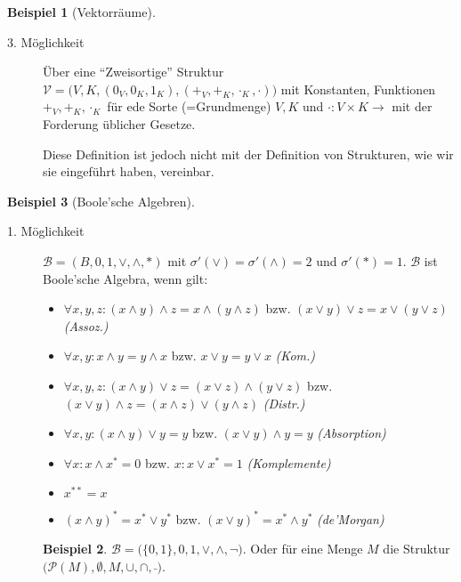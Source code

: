 \documentclass{article}
\theoremstyle{definition}
\newtheorem*{bsp}{Beispiel}
\theoremstyle{plain}
\newcommand{\m}[1]{\mathcal{#1}}
\begin{document}
\begin{bsp}[Vektorräume]
\begin{description}
            \item[3. Möglichkeit]
            Über eine ``Zweisortige'' Struktur $ \m{V} = \big(V, K, (0_V, 0_K, 1_K), (+_V, +_K, \cdot_K, \cdot)\big) $ mit Konstanten, Funktionen $ +_V, +_K, \cdot_K $ für ede Sorte (=Grundmenge) $ V, K $ und $ \cdot : V \times K \rightarrow $ mit der Forderung üblicher Gesetze.

            Diese Definition ist jedoch nicht mit der Definition von Strukturen, wie wir sie eingeführt haben, vereinbar.
        \end{description}
    \end{bsp}

    \begin{bsp}[Boole'sche Algebren]
        ~\par
        \begin{description}
            \item[1. Möglichkeit]
            \label{itm:boolesche-algebra-struktur}
            $ \m{B}= (B, 0, 1, \lor, \land, *) $ mit $ \sigma'(\lor) = \sigma'(\land) = 2 $ und $ \sigma'(*) = 1 $.
            $ \m{B} $ ist Boole'sche Algebra, wenn gilt:
            \begin{itemize}
                \item $ \forall x, y, z: (x \land y) \land z = x \land (y \land z) $ bzw. $ (x \lor y) \lor z = x \lor (y \lor z) $ \hfill \textit{(Assoz.)}
                \item $ \forall x, y: x \land y = y \land x $ bzw. $ x \lor y = y \lor x $ \hfill \textit{(Kom.)}
                \item $ \forall x, y, z: (x \land y) \lor z = (x \lor z) \land (y \lor z) $ bzw. $ (x \lor y) \land z = (x \land z) \lor (y \land z) $ \hfill \textit{(Distr.)}
                \item $ \forall x, y: (x \land y) \lor y = y $ bzw. $ (x \lor y) \land y = y $ \hfill \textit{(Absorption)}
                \item $ \forall x: x \land x^* = 0 $ bzw. $ x: x \lor x^* = 1 $ \hfill \textit{(Komplemente)}
                \item $ x^{**} = x $
                \item $ (x \land y)^* = x^* \lor y^* $ bzw. $ (x \lor y)^* = x^* \land y^* $ \hfill \textit{(de'Morgan)}
            \end{itemize}
            \begin{bsp}
                $ \m{B} = \big(\{0, 1\}, 0, 1, \lor, \land, \neg\big) $.
                Oder für eine Menge $ M $ die Struktur $ \big(\m{P}(M), \emptyset, M, \cup, \cap, \bar\; \big) $.
            \end{bsp}


\end{description}
\end{bsp}
\end{document}
